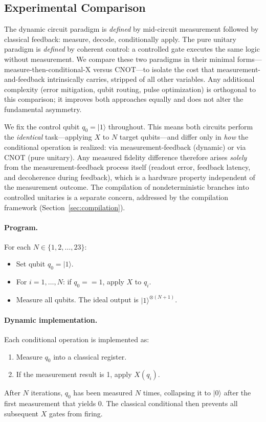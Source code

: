 \documentclass[11pt]{article}
\begin{document}
\subsection{Experimental Comparison}

The dynamic circuit paradigm is \emph{defined} by mid-circuit measurement followed by classical feedback: measure, decode, conditionally apply.
The pure unitary paradigm is \emph{defined} by coherent control: a controlled gate executes the same logic without measurement.
We compare these two paradigms in their minimal forms---measure-then-conditional-X versus CNOT---to isolate the cost that measurement-and-feedback intrinsically carries, stripped of all other variables.
Any additional complexity (error mitigation, qubit routing, pulse optimization) is orthogonal to this comparison; it improves both approaches equally and does not alter the fundamental asymmetry.

We fix the control qubit $q_0 = |1\rangle$ throughout.
This means both circuits perform the \emph{identical} task---applying $X$ to $N$ target qubits---and differ only in \emph{how} the conditional operation is realized: via measurement-feedback (dynamic) or via CNOT (pure unitary).
Any measured fidelity difference therefore arises \emph{solely} from the measurement-feedback process itself (readout error, feedback latency, and decoherence during feedback), which is a hardware property independent of the measurement outcome.
The compilation of nondeterministic branches into controlled unitaries is a separate concern, addressed by the compilation framework (Section~\ref{sec:compilation}).

\paragraph{Program.}
For each $N \in \{1, 2, \ldots, 23\}$:
\begin{itemize}
  \item Set qubit $q_0 = |1\rangle$.
  \item For $i = 1, \ldots, N$: if $q_0 == 1$, apply $X$ to $q_i$.
  \item Measure all qubits. The ideal output is $|1\rangle^{\otimes(N+1)}$.
\end{itemize}

\paragraph{Dynamic implementation.}
Each conditional operation is implemented as:
\begin{enumerate}
  \item Measure $q_0$ into a classical register.
  \item If the measurement result is 1, apply $X(q_i)$.
\end{enumerate}
After $N$ iterations, $q_0$ has been measured $N$ times, collapsing it to $|0\rangle$ after the first measurement that yields 0.
The classical conditional then prevents all subsequent $X$ gates from firing.
\end{document}
